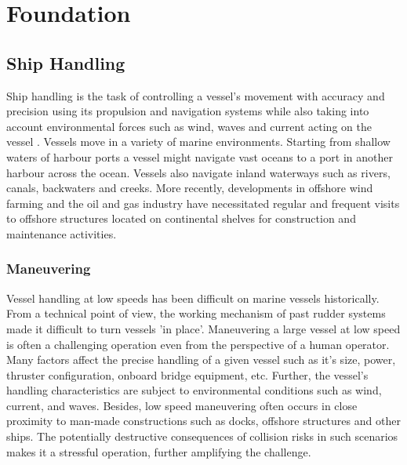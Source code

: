\chapter{Foundation}


\section{Ship Handling}

Ship handling is the task of controlling a vessel’s movement with accuracy and precision using its propulsion and navigation systems while also taking into account environmental forces such as wind, waves and current acting on the vessel \parencite{wiki:seamanship}. Vessels move in a variety of marine environments. Starting from shallow waters of harbour ports a vessel might navigate vast oceans to a port in another harbour across the ocean. Vessels also navigate inland waterways such as rivers, canals, backwaters and creeks. More recently, developments in offshore wind farming and the oil and gas industry have necessitated regular and frequent visits to offshore structures located on continental shelves for construction and maintenance activities. 


\subsection{Maneuvering}


Vessel handling at low speeds has been difficult on marine vessels historically. From a technical point of view, the working mechanism of past rudder systems made it difficult to turn vessels 'in place'. Maneuvering a large vessel at low speed is often a challenging operation even from the perspective of a human operator. Many factors affect the precise handling of a given vessel such as it's size, power, thruster configuration, onboard bridge equipment, etc. Further, the vessel's handling characteristics are subject to environmental conditions such as wind, current, and waves. Besides, low speed maneuvering often occurs in close proximity to man-made constructions such as docks, offshore structures and other ships. The potentially destructive consequences of collision risks in such scenarios makes it a stressful operation, further amplifying the challenge. 


